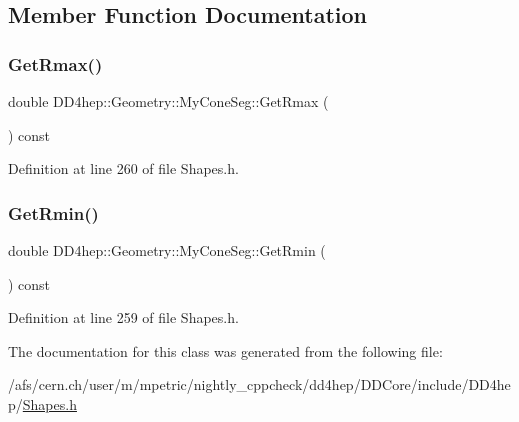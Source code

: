 \subsection{Member Function Documentation}
\hypertarget{class_d_d4hep_1_1_geometry_1_1_my_cone_seg_a49ac16f5bbc2d48fe93c94f2ead255d8}{}\label{class_d_d4hep_1_1_geometry_1_1_my_cone_seg_a49ac16f5bbc2d48fe93c94f2ead255d8} 
\subsubsection{\texorpdfstring{Get\+Rmax()}{GetRmax()}}
{\footnotesize\ttfamily double D\+D4hep\+::\+Geometry\+::\+My\+Cone\+Seg\+::\+Get\+Rmax (\begin{DoxyParamCaption}{ }\end{DoxyParamCaption}) const\hspace{0.3cm}{\ttfamily [inline]}}



Definition at line 260 of file Shapes.\+h.

\hypertarget{class_d_d4hep_1_1_geometry_1_1_my_cone_seg_ad05f78f0e94fcf5c5c48657bd7498f28}{}\label{class_d_d4hep_1_1_geometry_1_1_my_cone_seg_ad05f78f0e94fcf5c5c48657bd7498f28} 
\subsubsection{\texorpdfstring{Get\+Rmin()}{GetRmin()}}
{\footnotesize\ttfamily double D\+D4hep\+::\+Geometry\+::\+My\+Cone\+Seg\+::\+Get\+Rmin (\begin{DoxyParamCaption}{ }\end{DoxyParamCaption}) const\hspace{0.3cm}{\ttfamily [inline]}}



Definition at line 259 of file Shapes.\+h.



The documentation for this class was generated from the following file\+:\begin{DoxyCompactItemize}
\item 
/afs/cern.\+ch/user/m/mpetric/nightly\+\_\+cppcheck/dd4hep/\+D\+D\+Core/include/\+D\+D4hep/\hyperlink{_shapes_8h}{Shapes.\+h}\end{DoxyCompactItemize}

